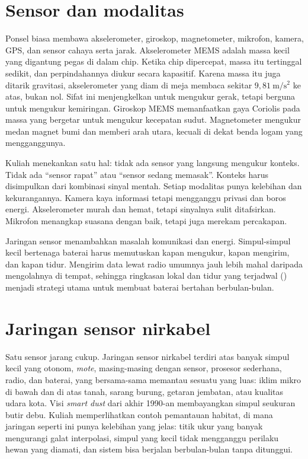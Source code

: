 \section{Sensor dan modalitas}

Ponsel biasa membawa akselerometer, giroskop, magnetometer, mikrofon, kamera, GPS, dan sensor cahaya serta jarak.
Akselerometer MEMS adalah massa kecil yang digantung pegas di dalam chip. Ketika chip dipercepat, massa itu
tertinggal sedikit, dan perpindahannya diukur secara kapasitif. Karena massa itu juga ditarik gravitasi,
akselerometer yang diam di meja membaca sekitar $9{,}81\ \mathrm{m/s^2}$ ke atas, bukan nol. Sifat ini
menjengkelkan untuk mengukur gerak, tetapi berguna untuk mengukur kemiringan. Giroskop MEMS memanfaatkan gaya
Coriolis pada massa yang bergetar untuk mengukur kecepatan sudut. Magnetometer mengukur medan magnet bumi dan
memberi arah utara, kecuali di dekat benda logam yang mengganggunya.

Kuliah menekankan satu hal: tidak ada sensor yang langsung mengukur konteks. Tidak ada ``sensor rapat'' atau
``sensor sedang memasak''. Konteks harus disimpulkan dari kombinasi sinyal mentah. Setiap modalitas punya
kelebihan dan kekurangannya. Kamera kaya informasi tetapi mengganggu privasi dan boros energi. Akselerometer murah
dan hemat, tetapi sinyalnya sulit ditafsirkan. Mikrofon menangkap suasana dengan baik, tetapi juga merekam
percakapan.

Jaringan sensor menambahkan masalah komunikasi dan energi. Simpul-simpul kecil bertenaga baterai harus memutuskan
kapan mengukur, kapan mengirim, dan kapan tidur. Mengirim data lewat radio umumnya jauh lebih mahal daripada
mengolahnya di tempat, sehingga ringkasan lokal dan tidur yang terjadwal () menjadi strategi
utama untuk membuat baterai bertahan berbulan-bulan.

\section{Jaringan sensor nirkabel}

Satu sensor jarang cukup. Jaringan sensor nirkabel terdiri atas banyak simpul kecil yang otonom, \emph{mote}, masing-masing dengan
sensor, prosesor sederhana, radio, dan baterai, yang bersama-sama memantau sesuatu yang luas: iklim mikro di bawah dan di atas tanah,
sarang burung, getaran jembatan, atau kualitas udara kota. Visi \emph{smart dust} dari akhir 1990-an membayangkan simpul seukuran
butir debu. Kuliah memperlihatkan contoh pemantauan habitat, di mana jaringan seperti ini punya kelebihan yang jelas: titik ukur yang
banyak mengurangi galat interpolasi, simpul yang kecil tidak mengganggu perilaku hewan yang diamati, dan sistem bisa berjalan
berbulan-bulan tanpa ditunggui.

